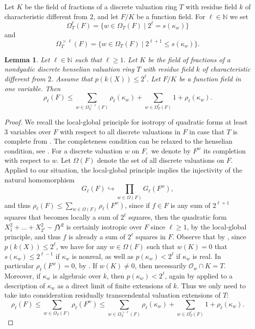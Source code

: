 \documentclass[a4paper,12pt,reqno]{amsart}
\newtheorem{lem}[thm]{Lemma}
\theoremstyle{definition}
\numberwithin{equation}{thm}
\renewcommand{\leq}{\leqslant}
\renewcommand{\geq}{\geqslant}
\begin{document}

 Let $K$ be the field of fractions of a discrete valuation ring $T$ with residue field $k$ of characteristic different from $2$, and let $F/K$ be a function field. For $\ell\in\mathbb{N}$ we set $$\Omega^{\ell}_T(F)=\{w\in\Omega_T (F)\mid 2^\ell = s(\kappa_{w})\}$$
 and 
 $$\Omega^{>\ell}_T(F)=\{w\in\Omega_T (F)\mid 2^{\ell+1} \leq s(\kappa_{w})\}.$$


\begin{lem}\label{lema-cotas-rho} Let $\ell\in\mathbb{N}$  such that $\ell\geq 1.$ Let $K$ be the field of fractions of a nondyadic discrete henselian valuation ring $T$ with residue field $k$ of characteristic different from $2$. Assume that $p(k(X))\leq 2^{\ell}.$ Let $F/K$ be a function field in one variable. Then $$\rho_{\ell}(F)\leq \sum_{w\in\Omega_T^{> \ell}(F)}\rho_{\ell}(\kappa_{w})+\sum_{w\in\Omega^{\ell}_T(F)}1+\rho_{\ell}(\kappa_{w}).$$ 
\end{lem}
\begin{proof} We recall the local-global principle for isotropy of quadratic forms at least $3$ variables over $F$ with respect to all discrete valuations in $F$ in case that $T$ is complete from \cite[Theorem 3.1]{CTPS12}. The completeness condition can be relaxed to the henselian condition, see \cite[Theorem 4.4]{BDGMZ}.
For a discrete valuation $w$ on $F,$ we denote by $F^{w}$ its completion with respect to $w$. Let $\Omega(F)$ denote the set of all discrete valuations on $F$. Applied to our situation, the local-global principle implies the injectivity of the natural homomorphism $$G_{\ell}(F)\hookrightarrow \prod_{w\in\Omega(F)}G_{\ell}(F^{w}),$$
and thus 
$\rho_\ell(F) \leq \sum_{w \in \Omega(F)} \rho_\ell(F^w)$,
since if $f \in F$ is any sum of $2^{\ell+1}$ squares that becomes locally a sum of $2^\ell$ squares, then
the quadratic form $X^2_1 + \ldots + X^2_{2^\ell} - f Y^2$
is certainly isotropic over $F$ since $\ell \geq 1$, by the local-global principle, and thus $f$ is already a sum of $2^\ell$ squares in $F$.
Observe that by \cite[Theorem 3.5]{BVG}, since $p(k(X))\leq 2^\ell$, we have for any $w\in \Omega(F)$ such that $w(K)=0$ that $s(\kappa_w) \leq 2^{\ell-1}$ if  $\kappa_w$ is nonreal, as well as $p(\kappa_w)< 2^\ell$ if $\kappa_w$ is real. In particular $\rho_\ell(F^w)=0$, by . If $w(K) \neq 0$, then necessarily $\mathcal{O}_w \cap K=T$. Moreover, if $\kappa_w$ is algebraic over $k$, then $p(\kappa_w) < 2^\ell$, again by \cite[Theorem 3.5]{BVG} applied to a description of $\kappa_w$ as a direct limit of finite extensions of $k$.
Thus we only need to take into consideration residually transcendental valuation extensions of $T$:
$$\rho_\ell(F) \leq \sum_{w \in \Omega_T(F)} \rho_\ell(F^w)\leq \sum_{w \in \Omega^{>\ell}_T(F)} \rho_\ell(\kappa_w) + \sum_{w \in \Omega^\ell_T(F)} 1 + \rho_\ell(\kappa_w).$$
\end{proof}
\end{document}

